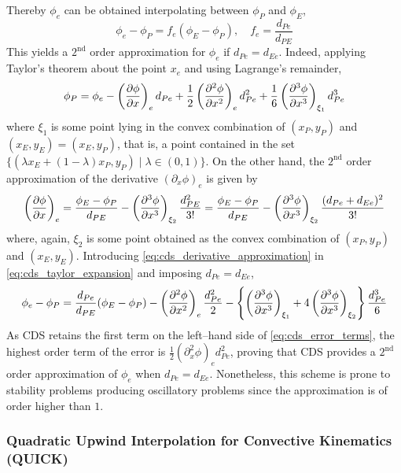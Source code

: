 \noindent
Thereby $\phi_e$ can be obtained interpolating between $\phi_P$ and $\phi_E$,
\begin{equation}
	\phi_e - \phi_P = f_e \left( \phi_E - \phi_P \right), \quad f_e = \frac{d_{Pe}}{d_{PE}}
\end{equation}
This yields a $2^{\text{nd}}$ order approximation for $\phi_e$ if $d_{Pe} = d_{Ee}$. Indeed, applying Taylor's theorem about the point $x_e$ and using Lagrange's remainder,
\begin{equation} \label{eq:cds_taylor_expansion}
	\phi_P = 
	\phi_e 
	- \left(\pdv{\phi}{x}\right)_e d_{Pe} 
	+ \frac{1}{2} \left(\pdv[2]{\phi}{x}\right)_e d_{Pe}^2 
	+ \frac{1}{6} \left(\pdv[3]{\phi}{x}\right)_{\xi_1} d_{Pe}^3
\end{equation}
where $\xi_1$ is some point lying in the convex combination of $(x_P, y_P)$ and $(x_E, y_E) = (x_E, y_P)$, that is, a point contained in the set $\{ (\lambda x_E + (1 - \lambda) x_P, y_P) \mid \lambda \in (0,1) \}$. On the other hand, the $2^\text{nd}$ order approximation of the derivative $(\partial_x \phi)_e$ is given by
\begin{equation} \label{eq:cds_derivative_approximation}
	\left(\pdv{\phi}{x}\right)_e = 
	\frac{\phi_E - \phi_P}{d_{PE}} - \left(\pdv[3]{\phi}{x}\right)_{\xi_2} \frac{d_{PE}^2}{3!} = 	
	\frac{\phi_E - \phi_P}{d_{PE}} - \left(\pdv[3]{\phi}{x}\right)_{\xi_2} \frac{(d_{Pe} + d_{Ee})^2}{3!}
\end{equation}
where, again, $\xi_2$ is some point obtained as the convex combination of $(x_P, y_P)$ and $(x_E, y_E)$. Introducing \eqref{eq:cds_derivative_approximation} in \eqref{eq:cds_taylor_expansion} and imposing $d_{Pe} = d_{Ee}$, 
\begin{equation} \label{eq:cds_error_terms}
	\phi_e - \phi_P = 
	\frac{d_{Pe}}{d_{PE}} (\phi_E - \phi_P) - 
	\left( \pdv[2]{\phi}{x} \right)_e \frac{d_{Pe}^2}{2} -
	\left\{ 
	\left( \pdv[3]{\phi}{x} \right)_{\xi_1} + 4 \left( \pdv[3]{\phi}{x} \right)_{\xi_2}
	\right\} 
	\frac{d_{Pe}^3}{6}
\end{equation}
As CDS retains the first term on the left--hand side of \eqref{eq:cds_error_terms}, the highest order term of the error is $\frac{1}{2} (\partial_x^2 \phi)_e d_{Pe}^2$, proving that CDS provides a $2^\text{nd}$ order approximation of $\phi_e$ when $d_{Pe} = d_{Ee}$. Nonetheless, this scheme is prone to stability problems producing oscillatory problems since the approximation is of order higher than $1$.

\subsubsection{Quadratic Upwind Interpolation for Convective Kinematics (QUICK)}

